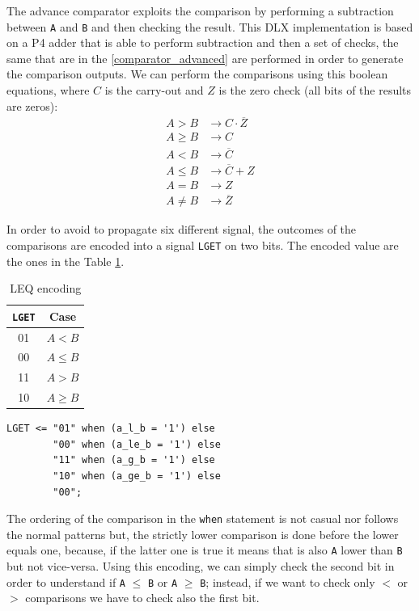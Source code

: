 The advance comparator exploits the comparison by performing a subtraction between \texttt{A} and \texttt{B} and then checking the result. This DLX implementation is based on a P4 adder that is able to perform subtraction and then a set of checks, the same that are in the \ref{comparator_advanced} are performed in order to generate the comparison outputs. We can perform the comparisons using this boolean equations, where $C$ is the carry-out and $Z$ is the zero check (all bits of the results are zeros):
\begin{align*}
	A > B &\rightarrow C \cdot \overline{Z}\\
	A \geq B &\rightarrow C\\
	A < B  &\rightarrow \overline{C}\\
	A \leq B &\rightarrow \overline{C} + Z\\
	A = B &\rightarrow Z\\
	A \neq B  &\rightarrow \overline{Z} 
\end{align*}

 In order to avoid to propagate six different signal, the outcomes of the comparisons are encoded into a signal \texttt{LGET} on two bits. The encoded value are the ones in the Table \ref{tab:lget}.
 \begin{multicols}{2}
 	\begin{table}[H]
 		\begin{center}
 			\begin{tabular}{ c| c}
 				\texttt{LGET} & Case\\
 				\hline
 				01 & $A < B$ \\
 				00 & $A \leq B$ \\
 				11 & $A > B$ \\
 				10 & $A \geq B$
 				
 			\end{tabular}
 			\caption{LEQ encoding}
 			\label{tab:lget}
 		\end{center}
 	\end{table}
 	
 	\columnbreak
 	
 	\begin{lstlisting}[style=vhdl,caption={VHDL code for the encodig},label=lget_code]
 	LGET <= "01" when (a_l_b = '1') else
	 	"00" when (a_le_b = '1') else 
	 	"11" when (a_g_b = '1') else
	 	"10" when (a_ge_b = '1') else
	 	"00";
 	\end{lstlisting}
 \end{multicols}

The ordering of the comparison in the \texttt{when} statement is not casual nor follows the normal patterns but, the strictly lower comparison is done before the lower equals one, because, if the latter one is true it means that is also \texttt{A} lower than \texttt{B} but not vice-versa. Using this encoding, we can simply check the second bit in order to understand if \texttt{A} $\leq$ \texttt{B} or \texttt{A} $\geq$ \texttt{B}; instead, if we want to check only $<$ or $>$ comparisons we have to check also the first bit.


